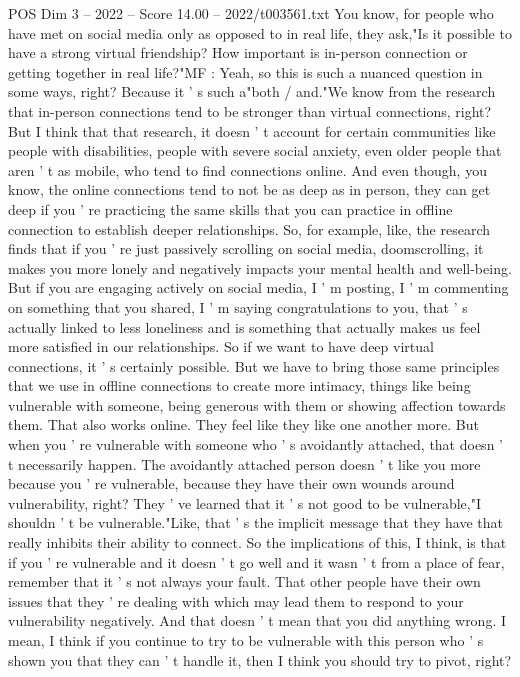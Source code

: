 \begin{textsample}{POS Dim 3 – 2022 – Score 14.00 – 2022/t003561.txt}
You know, for people who have met on social media only as opposed to in real life, they ask,"Is it possible to have a strong virtual friendship?
How important is in-person connection or getting together in real life?"MF : Yeah, so this is such a nuanced question in some ways, right?
Because it ' s such a"both / and."We know from the research that in-person connections tend to be stronger than virtual connections, right?
But I think that that research, it doesn ' t account for certain communities like people with disabilities, people with severe social anxiety, even older people that aren ' t as mobile, who tend to find connections online.
And even though, you know, the online connections tend to not be as deep as in person, they can get deep if you ' re practicing the same skills that you can practice in offline connection to establish deeper relationships.
So, for example, like, the research finds that if you ' re just passively scrolling on social media, doomscrolling, it makes you more lonely and negatively impacts your mental health and well-being.
But if you are engaging actively on social media, I ' m posting, I ' m commenting on something that you shared, I ' m saying congratulations to you, that ' s actually linked to less loneliness and is something that actually makes us feel more satisfied in our relationships.
So if we want to have deep virtual connections, it ' s certainly possible.
But we have to bring those same principles that we use in offline connections to create more intimacy, things like being vulnerable with someone, being generous with them or showing affection towards them.
That also works online.
They feel like they like one another more.
But when you ' re vulnerable with someone who ' s avoidantly attached, that doesn ' t necessarily happen.
The avoidantly attached person doesn ' t like you more because you ' re vulnerable, because they have their own wounds around vulnerability, right?
They ' ve learned that it ' s not good to be vulnerable,"I shouldn ' t be vulnerable."Like, that ' s the implicit message that they have that really inhibits their ability to connect.
So the implications of this, I think, is that if you ' re vulnerable and it doesn ' t go well and it wasn ' t from a place of fear, remember that it ' s not always your fault.
That other people have their own issues that they ' re dealing with which may lead them to respond to your vulnerability negatively.
And that doesn ' t mean that you did anything wrong.
I mean, I think if you continue to try to be vulnerable with this person who ' s shown you that they can ' t handle it, then I think you should try to pivot, right?

\end{textsample}
